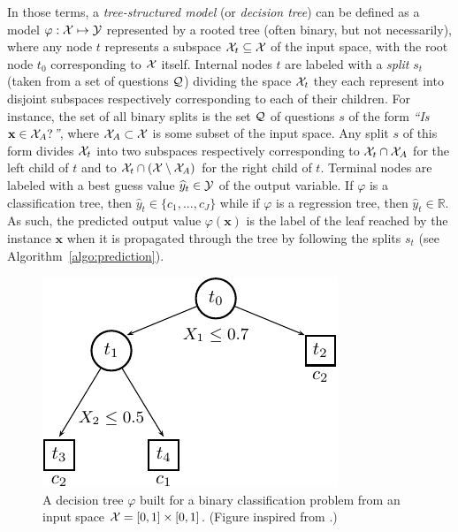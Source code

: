 In those terms, a \textit{tree-structured model} (or \textit{decision tree})
can be defined as a model $\varphi: {\cal X} \mapsto {\cal Y}$ represented by a
rooted tree (often binary, but not necessarily), where any node $t$ represents
a subspace ${\cal X}_t \subseteq {\cal X}$ of the input space, with the root
node $t_0$ corresponding to ${\cal X}$ itself. Internal nodes $t$ are labeled with a
\textit{split} $s_t$ (taken from a set of questions ${\cal Q}$) dividing the
space ${\cal X}_t$ they each represent into disjoint subspaces respectively
corresponding to each of their children. For instance, the set of all binary
splits is the set ${\cal Q}$ of questions $s$ of the form \textit{``Is
$\mathbf{x} \in {\cal X}_A?$''}, where ${\cal X}_A \subset {\cal X}$ is some
subset of the input space. Any split $s$ of this form divides ${\cal X}_t$ into
two subspaces respectively corresponding to ${\cal X}_t \cap {\cal X}_A$ for
the left child of $t$ and to ${\cal X}_t \cap ({\cal X}\setminus{\cal X}_A)$
for the right child of $t$. Terminal nodes are labeled with a best guess value
$\widehat{y}_t \in {\cal Y}$ of the output variable. If $\varphi$ is a
classification tree, then $\widehat{y}_t \in \{ c_1, ..., c_J \}$ while if
$\varphi$ is a regression tree, then $\widehat{y}_t \in \mathbb{R}$. As such,
the predicted output value $\varphi(\mathbf{x})$
is the label of the leaf reached by the instance $\mathbf{x}$ when it is propagated through
the tree by following the splits $s_t$ (see Algorithm~\ref{algo:prediction}).


\begin{figure}
    \centering
    \includegraphics[scale=1.0]{figures/ch3_tree.pdf}
    \caption{A decision tree $\varphi$ built for a binary classification
             problem from an input space ${\cal X}=[0,1]\times[0,1]$.
             (Figure inspired from \citet{breiman:1984}.)}
    \label{fig:3:tree}
\end{figure}

